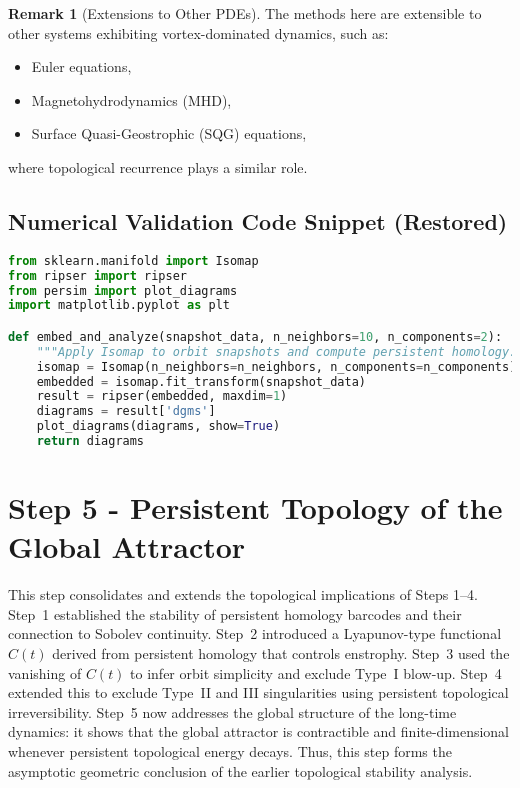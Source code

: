 \documentclass[11pt]{article}
\theoremstyle{definition}
\newtheorem{remark}[theorem]{Remark}
\begin{document}
\begin{remark}[Extensions to Other PDEs]
The methods here are extensible to other systems exhibiting vortex-dominated dynamics, such as:
\begin{itemize}
  \item Euler equations,
  \item Magnetohydrodynamics (MHD),
  \item Surface Quasi-Geostrophic (SQG) equations,
\end{itemize}
where topological recurrence plays a similar role.
\end{remark}

\subsection*{Numerical Validation Code Snippet (Restored)}

\begin{lstlisting}[language=Python, caption=Isomap + Persistent Homology Validation for Navier--Stokes Orbit Geometry]
from sklearn.manifold import Isomap
from ripser import ripser
from persim import plot_diagrams
import matplotlib.pyplot as plt

def embed_and_analyze(snapshot_data, n_neighbors=10, n_components=2):
    """Apply Isomap to orbit snapshots and compute persistent homology."""
    isomap = Isomap(n_neighbors=n_neighbors, n_components=n_components)
    embedded = isomap.fit_transform(snapshot_data)
    result = ripser(embedded, maxdim=1)
    diagrams = result['dgms']
    plot_diagrams(diagrams, show=True)
    return diagrams
\end{lstlisting}



\section{Step 5 - Persistent Topology of the Global Attractor}
\label{sec:step5}

This step consolidates and extends the topological implications of Steps 1--4. Step~1 established the stability of persistent homology barcodes and their connection to Sobolev continuity. Step~2 introduced a Lyapunov-type functional $C(t)$ derived from persistent homology that controls enstrophy. Step~3 used the vanishing of $C(t)$ to infer orbit simplicity and exclude Type~I blow-up. Step~4 extended this to exclude Type~II and III singularities using persistent topological irreversibility. Step~5 now addresses the global structure of the long-time dynamics: it shows that the global attractor is contractible and finite-dimensional whenever persistent topological energy decays. Thus, this step forms the asymptotic geometric conclusion of the earlier topological stability analysis.
\end{document}
